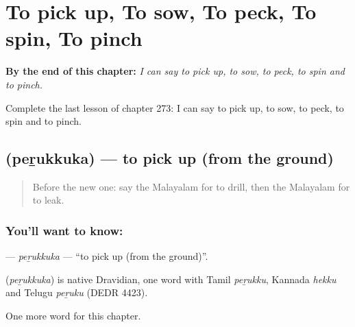 
\chapter{To pick up, To sow, To peck, To spin, To pinch}
\label{ch:ml-to-pick-up-to-sow-to-peck-to-spin-to-pinch}

\begin{chapteropening}
\textbf{By the end of this chapter:} \emph{I can say to pick up, to sow, to peck, to spin and to pinch.}

Complete the last lesson of chapter 273: I can say to pick up, to sow, to peck, to spin and to pinch.
\end{chapteropening}

\section[\texorpdfstring{\ml{പെറുക്കുക} (peṟukkuka)}{പെറുക്കുക (peṟukkuka)}]{ (peṟukkuka) — to pick up (from the ground)}

\label{lesson:ML-C273-perukkuka}



\begin{quote}
Before the new one: say the Malayalam for to drill, then the Malayalam for to leak.
\end{quote}

\subsection*{You'll want to know: }
\textbf{} — \emph{peṟukkuka} — \textquotedblleft{}to pick up (from the ground)\textquotedblright{}.

\begin{cousinweb}
\textbf{} (\emph{peṟukkuka}) is native Dravidian, one word with Tamil \emph{peṟukku}, Kannada \emph{hekku} and Telugu \emph{peṟuku} (DEDR 4423).
\end{cousinweb}

\begin{grammarlens}[title={What you've built}]
One more word for this chapter.
\end{grammarlens}


